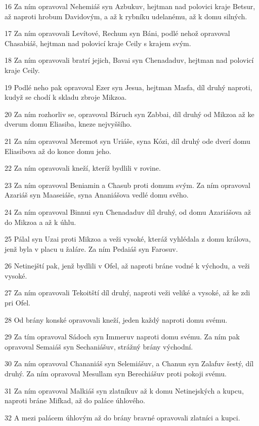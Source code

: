 \par 16 Za ním opravoval Nehemiáš syn Azbukuv, hejtman nad polovici kraje Betsur, až naproti hrobum Davidovým, a až k rybníku udelanému, až k domu silných.
\par 17 Za ním opravovali Levítové, Rechum syn Báni, podlé nehož opravoval Chasabiáš, hejtman nad polovicí kraje Ceily s krajem svým.
\par 18 Za ním opravovali bratrí jejich, Bavai syn Chenadaduv, hejtman nad polovicí kraje Ceily.
\par 19 Podlé neho pak opravoval Ezer syn Jesua, hejtman Masfa, díl druhý naproti, kudyž se chodí k skladu zbroje Mikzoa.
\par 20 Za ním rozhorliv se, opravoval Báruch syn Zabbai, díl druhý od Mikzoa až ke dverum domu Eliasiba, kneze nejvyššího.
\par 21 Za ním opravoval Meremot syn Uriáše, syna Kózi, díl druhý ode dverí domu Eliasibova až do konce domu jeho.
\par 22 Za ním opravovali kneží, kteríž bydlili v rovine.
\par 23 Za ním opravoval Beniamin a Chasub proti domum svým. Za ním opravoval Azariáš syn Maaseiáše, syna Ananiášova vedlé domu svého.
\par 24 Za ním opravoval Binnui syn Chenadaduv díl druhý, od domu Azariášova až do Mikzoa a až k úhlu.
\par 25 Pálal syn Uzai proti Mikzoa a veži vysoké, kteráž vyhlédala z domu králova, jenž byla v placu u žaláre. Za ním Pedaiáš syn Farosuv.
\par 26 Netinejští pak, jenž bydlili v Ofel, až naproti bráne vodné k východu, a veži vysoké.
\par 27 Za ním opravovali Tekoitští díl druhý, naproti veži veliké a vysoké, až ke zdi pri Ofel.
\par 28 Od brány konské opravovali kneží, jeden každý naproti domu svému.
\par 29 Za tím opravoval Sádoch syn Immeruv naproti domu svému. Za ním pak opravoval Semaiáš syn Sechaniášuv, strážný brány východní.
\par 30 Za ním opravoval Chananiáš syn Selemiášuv, a Chanun syn Zalafuv šestý, díl druhý. Za ním opravoval Mesullam syn Berechiášuv proti pokoji svému.
\par 31 Za ním opravoval Malkiáš syn zlatníkuv až k domu Netinejských a kupcu, naproti bráne Mifkad, až do paláce úhlového.
\par 32 A mezi palácem úhlovým až do brány bravné opravovali zlatníci a kupci.


